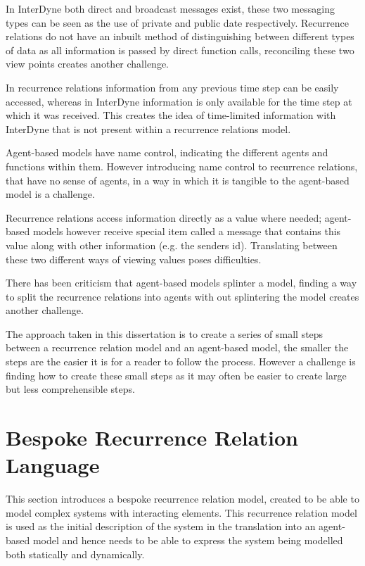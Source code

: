 \documentclass{article}
\begin{document}
In InterDyne both direct and broadcast messages exist, these two messaging types can be seen as the use of private and public date respectively. Recurrence relations do not have an inbuilt method of distinguishing between different types of data as all information is passed by direct function calls, reconciling these two view points creates another challenge. 

In recurrence relations information from any previous time step can be easily accessed, whereas in InterDyne information is only available for the time step at which it was received. This creates the idea of time-limited information with InterDyne that is not present within a recurrence relations model.   

Agent-based models have name control, indicating the different agents and functions within them. However introducing name control to  recurrence relations, that have no sense of agents, in a way in which it is tangible to the agent-based model is a challenge. 

Recurrence relations access information directly as a value where needed; agent-based models however receive special item called a message that contains this value along with other information (e.g. the senders id). Translating between these two different ways of viewing values poses difficulties.  

There has been criticism that agent-based models splinter a model, finding a way to split the recurrence relations into agents with out splintering the model creates another challenge. 

The approach taken in this dissertation is to create a series of small steps between a recurrence relation model and an agent-based model, the smaller the steps are the easier it is for a reader to follow the process. However a challenge is finding how to create these small steps as it may often be easier to create large but less comprehensible steps.   








\newpage
\section{Bespoke Recurrence Relation Language} \label{beskoperecurrancerealtion}
This section introduces a bespoke recurrence relation model, created to be able to model complex systems with interacting elements. This recurrence relation model is used as the initial description of the system in the translation into an agent-based model and hence needs to be able to express the system being modelled both statically and dynamically. 
\end{document}
